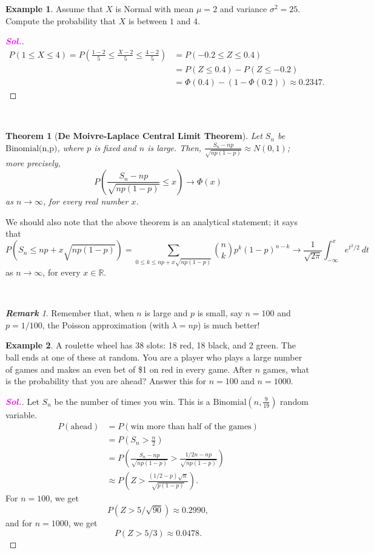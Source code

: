 \documentclass[12pt,a4paper]{article}
\newtheorem{theorem}{Theorem}[section]
\theoremstyle{definition}
\newtheorem{example}{Example}[section]
\theoremstyle{definition}
\theoremstyle{definition}
\theoremstyle{definition}
\theoremstyle{remark}
\newtheorem*{remark}{\bf Remark}
\theoremstyle{definition}
\newcommand{\dispsty}{\displaystyle}
\newcommand{\sol}{\textcolor{magenta}{\bf \textit{Sol.}}\quad}
\begin{document}
\begin{example}
	Assume that $X$ is Normal with mean $\mu=2$ and variance $\sigma^2=25$. Compute the probability that $X$ is between $1$ and $4$.\begin{proof}[\sol]
		\begin{align*}
		P(1\leq X\leq 4)=P\left(\frac{1-2}{5}\leq\frac{X-2}{5}\leq\frac{4-2}{5}\right)
		&=P(-0.2\leq Z\leq 0.4)\\
		&=P(Z\leq 0.4)-P(Z\leq -0.2)\\
		&=\Phi(0.4)-(1-\Phi(0.2))\approx0.2347.
		\end{align*}
	\end{proof}
\end{example}
\
\begin{tcolorbox}[colback=white]
	\begin{theorem}[\bf De Moivre-Laplace Central Limit Theorem]
		Let $S_n$ be $\text{Binomial(n,p)}$, where $p$ is fixed and $n$ is large. Then, $\dispsty\frac{S_n-np}{\sqrt{np(1-p)}}\approx N(0,1)$; more precisely, \[
		P\left(\frac{S_n-np}{\sqrt{np(1-p)}}\leq x\right)\to\Phi(x)
		\] as $n\to\infty$, for every real number $x$.
	\end{theorem}\tcblower
	We should also note that the above theorem is an analytical statement; it says that \[
	P\left(S_n\leq np+x\sqrt{np(1-p)}\right)=\sum_{0\leq k\leq np+x\sqrt{np(1-p)}}\binom{n}{k}p^k(1-p)^{n-k}\to\frac{1}{\sqrt{2\pi}}\int_{-\infty}^xe^{t^2/2}\ dt
	\] as $n\to\infty$, for every $x\in\mathbb{R}$.
\end{tcolorbox}
\
\begin{remark}
	Remember that, when $n$ is large and $p$ is small, say $n=100$ and $p=1/100$, the Poisson approximation (with $\lambda=np$) is much better!
\end{remark}
\begin{example}
	A roulette wheel has 38 slots: 18 red, 18 black, and 2 green. The ball ends at one of these at random. You are a player who plays a large number of games and makes an even bet of \$1 on red in every game. After $n$ games, what is the probability that you are ahead? Answer this for $n=100$ and $n=1000$.\begin{proof}[\sol]
		Let $S_n$ be the number of times you win. This is a $\text{Binomial}\left(n,\frac{9}{19}\right)$ random variable. \begin{align*}
		P(\text{ahead})&=P(\text{win more than half of the games})\\
		&=P\left(S_n>\frac{n}{2}\right)\\
		&=P\left(\frac{S_n-np}{\sqrt{np(1-p)}}>\frac{1/2n-np}{\sqrt{np(1-p)}}\right)\\
		&\approx P\left(Z>\frac{(1/2-p)\sqrt{n}}{\sqrt{p(1-p)}}\right).
		\end{align*} For $n=100$, we get \[
		P(Z>5/\sqrt{90})\approx0.2990,
		\] and for $n=1000$, we get \[
		P(Z>5/3)\approx0.0478.
		\]
	\end{proof}
\end{example}
\end{document}
